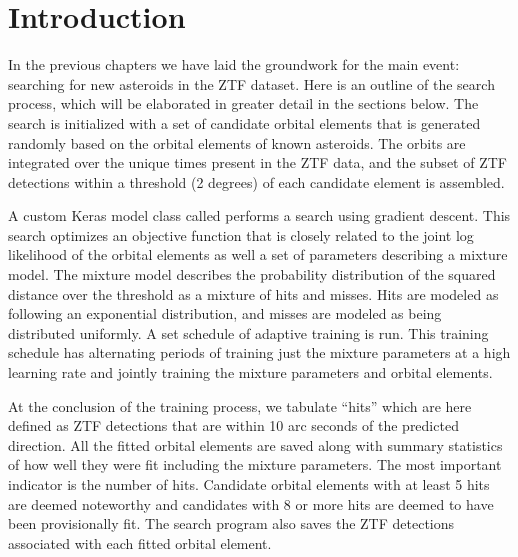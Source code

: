 \section{Introduction}
\label{section_search_intro}
In the previous chapters we have laid the groundwork for the main event: searching for new asteroids in the ZTF dataset.
Here is an outline of the search process, which will be elaborated in greater detail in the sections below.
The search is initialized with a set of candidate orbital elements that is generated randomly based on the orbital elements of known asteroids.
The orbits are integrated over the unique times present in the ZTF data, 
and the subset of ZTF detections within a threshold (2 degrees) of each candidate element is assembled.

A custom Keras model class called  performs a search using gradient descent.
This search optimizes an objective function that is closely related to the joint log likelihood of the orbital elements
as well a set of parameters describing a mixture model.
The mixture model describes the probability distribution of the squared distance over the threshold as a mixture of hits and misses.
Hits are modeled as following an exponential distribution, and misses are modeled as being distributed uniformly.
A set schedule of adaptive training is run.  
This training schedule has alternating periods of training just the mixture parameters at a high learning rate
and jointly training the mixture parameters and orbital elements.

At the conclusion of the training process, we tabulate ``hits'' which are here defined as ZTF detections that are within 10 arc seconds of the predicted direction.
All the fitted orbital elements are saved along with summary statistics of how well they were fit including the mixture parameters.
The most important indicator is the number of hits.
Candidate orbital elements with at least 5 hits are deemed noteworthy and candidates with 8 or more hits are deemed to have been provisionally fit.
The search program also saves the ZTF detections associated with each fitted orbital element.

